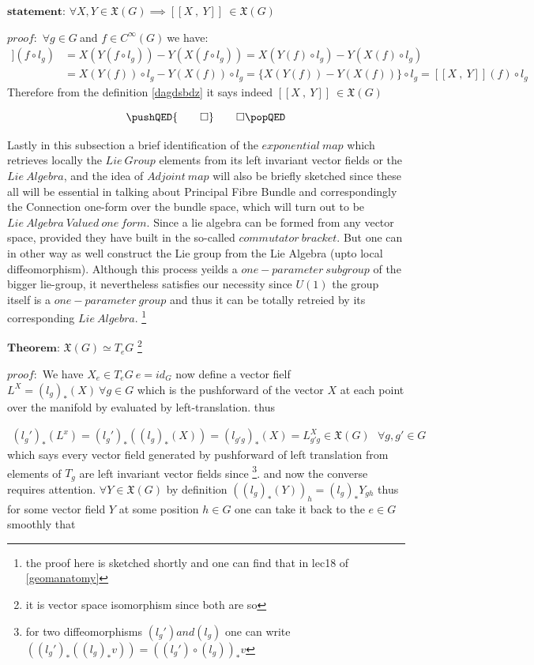 \documentclass[8pt, twocoloumn]{article}
\begin{document}
  $\textbf{statement:}$ $\forall X, Y \in \mathfrak{X}(G) \implies [\![ X \ , \ Y ]\!] \ \in \mathfrak{X}(G)$ 
  
  $proof:$ $\forall g \in G \ $and $f \in C^{\infty}(G) \ $we have: 
  \begin{align}
  [\![ X \ , \ Y ]\!](f \circ l_g) &=X(Y(f \circ l_g)) - Y(X(f \circ l_g ))  = X(Y(f) \circ l_g ) - Y(X(f) \circ l_g ) \\
  & = X(Y(f)) \circ l_g - Y(X(f)) \circ l_g  = \{ X(Y(f)) - Y(X(f))\} \circ l_g =   [\![ X \ , \ Y ]\!](f)  \circ l_g
  \end{align}
 Therefore from the definition \ref{dagdsbdz} it says indeed $[\![ X \ , \ Y ]\!] \ \in \mathfrak{X}(G)$
 
   \[
\pushQED{\qed} \qedhere
\popQED
\]  

Lastly in this subsection a brief identification of the $exponential \ map$ which retrieves locally the $Lie \ Group$ elements from its left invariant vector fields or the $Lie \ Algebra$, and the idea of $Adjoint \ map$ will also be briefly sketched since these all will be essential in talking about Principal Fibre Bundle and correspondingly the Connection one-form over the bundle space, which will turn out to be $Lie \ Algebra \ Valued \ one \ form.$ Since a lie algebra can be formed from any vector space, provided they have built in the so-called $commutator \ bracket$. But one can in other way as well construct the Lie group from the Lie Algebra (upto local diffeomorphism). Although this process yeilds a $one-parameter \ subgroup$ of the bigger lie-group, it nevertheless satisfies our necessity since $U(1)$ the group itself is a $one-parameter \ group$ and thus it can be totally retreied by its corresponding $Lie \ Algebra$. \footnote{the proof here is sketched shortly and one can find that in lec18 of \ref{geomanatomy}}

$\textbf{Theorem:}${\label{lieidentan}} $\mathfrak{X}(G) \simeq T_eG$ \footnote{it is vector space isomorphism since both are so}

$proof:$ We have $X_e \in T_eG \ e = id_{G}$ now define a vector fielf $L^X = {(l_g)}_{*}(X) \ \forall g \in G$ which is the pushforward of the vector $X$ at each point over the manifold by evaluated by left-translation. thus

\begin{align}
{(l_g')}_{*}(L^x) = {(l_g')}_{*}({(l_g)}_{*}(X)) = {(l_{g'g})}_{*}(X) = L^{X}_{g'g} \in \mathfrak{X}(G) \  \ \ \forall g, g' \in G
\end{align}
which says every vector field generated by pushforward of left translation from elements of $T_g$ are left invariant vector fields since \footnote{for two diffeomorphisms ${(l_g')} and {(l_g)}$ one can write $({(l_g')}_{*}({(l_g)}_{*}v)) = {({(l_g')} \circ  {(l_g)})}_{*}v$}{\label{ndfushdofsd}}. and now the converse requires attention. 
$\forall Y \in \mathfrak{X}(G)$ by definition ${({(l_g)}_{*}(Y))}_{h}={(l_g)}_{*}Y_{gh}$ thus for some vector field $Y$ at some position $h\in G$ one can take it back to the $e \in G$ smoothly that
\end{document}
